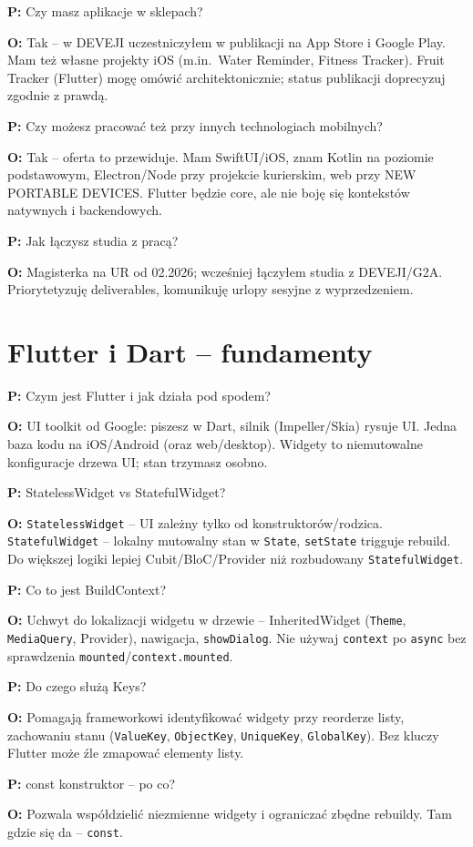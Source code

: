\documentclass[11pt,a4paper]{article}
\newcommand{\pyt}[1]{\par\medskip\noindent\textbf{P:} #1\par}
\newcommand{\odp}[1]{\noindent\textbf{O:} #1\par}
\begin{document}
\pyt{Czy masz aplikacje w sklepach?}
\odp{Tak -- w DEVEJI uczestniczyłem w publikacji na App Store i Google Play. Mam też własne projekty iOS (m.in.\ Water Reminder, Fitness Tracker). Fruit Tracker (Flutter) mogę omówić architektonicznie; status publikacji doprecyzuj zgodnie z prawdą.}

\pyt{Czy możesz pracować też przy innych technologiach mobilnych?}
\odp{Tak -- oferta to przewiduje. Mam SwiftUI/iOS, znam Kotlin na poziomie podstawowym, Electron/Node przy projekcie kurierskim, web przy NEW PORTABLE DEVICES. Flutter będzie core, ale nie boję się kontekstów natywnych i backendowych.}

\pyt{Jak łączysz studia z pracą?}
\odp{Magisterka na UR od 02.2026; wcześniej łączyłem studia z DEVEJI/G2A. Priorytetyzuję deliverables, komunikuję urlopy sesyjne z wyprzedzeniem.}

\section{Flutter i Dart -- fundamenty}

\pyt{Czym jest Flutter i jak działa pod spodem?}
\odp{UI toolkit od Google: piszesz w Dart, silnik (Impeller/Skia) rysuje UI. Jedna baza kodu na iOS/Android (oraz web/desktop). Widgety to niemutowalne konfiguracje drzewa UI; stan trzymasz osobno.}

\pyt{StatelessWidget vs StatefulWidget?}
\odp{\texttt{StatelessWidget} -- UI zależny tylko od konstruktorów/rodzica. \texttt{StatefulWidget} -- lokalny mutowalny stan w \texttt{State}, \texttt{setState} trigguje rebuild. Do większej logiki lepiej Cubit/BloC/Provider niż rozbudowany \texttt{StatefulWidget}.}

\pyt{Co to jest BuildContext?}
\odp{Uchwyt do lokalizacji widgetu w drzewie -- InheritedWidget (\texttt{Theme}, \texttt{MediaQuery}, Provider), nawigacja, \texttt{showDialog}. Nie używaj \texttt{context} po \texttt{async} bez sprawdzenia \texttt{mounted}/\texttt{context.mounted}.}

\pyt{Do czego służą Keys?}
\odp{Pomagają frameworkowi identyfikować widgety przy reorderze listy, zachowaniu stanu (\texttt{ValueKey}, \texttt{ObjectKey}, \texttt{UniqueKey}, \texttt{GlobalKey}). Bez kluczy Flutter może źle zmapować elementy listy.}

\pyt{const konstruktor -- po co?}
\odp{Pozwala współdzielić niezmienne widgety i ograniczać zbędne rebuildy. Tam gdzie się da -- \texttt{const}.}
\end{document}

